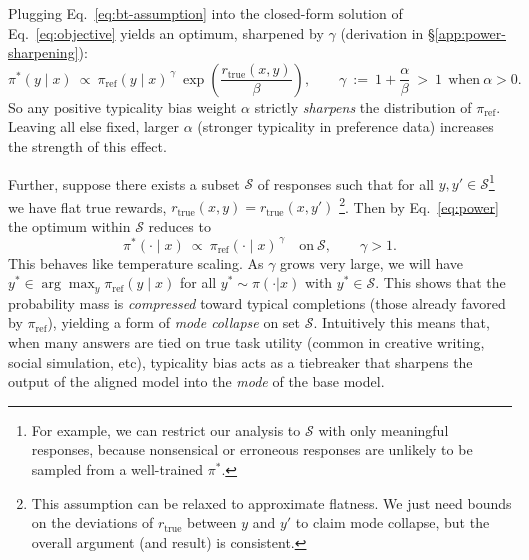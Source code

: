 Plugging Eq.~\ref{eq:bt-assumption} 
into the closed-form solution of Eq.~\ref{eq:objective} \citep{rafailov2024directpreferenceoptimizationlanguage}  yields an optimum, sharpened by $\gamma$ (derivation in \S\ref{app:power-sharpening}):
\begin{equation}
\pi^*(y\mid x)\ \propto\ \pi_{\mathrm{ref}}(y\mid x)^{\,\gamma}\ \exp\!\left(\frac{r_{\text{true}}(x,y)}{\beta}\right),\qquad
\gamma\ :=\ 1+\frac{\alpha}{\beta}\ >\ 1\ \ \text{when}\ \alpha>0.
\label{eq:power}
\end{equation}
So any positive typicality bias weight $\alpha$ strictly \emph{sharpens} the distribution of $\pi_{\text{ref}}$. Leaving all else fixed, larger $\alpha$ (stronger typicality in preference data) increases the strength of this effect.

Further, suppose there exists a subset $\mathcal{S}$ of responses such that for all $y,y'\!\in\!\mathcal{S}$\footnote{For example, we can restrict our analysis to $\mathcal{S}$ with only meaningful responses, because nonsensical or erroneous responses are unlikely to be sampled from a well-trained $\pi^*$. 
} we have 
flat true rewards, $r_{\text{true}}(x,y)=r_{\text{true}}(x,y')$
\footnote{This assumption can be relaxed to approximate flatness. We just need bounds on the deviations of $r_{\mathrm{\text{true}}}$ between $y$ and $y'$ to claim mode collapse, but the overall argument (and result) is consistent. 
}.%
Then by Eq.~\ref{eq:power} the optimum within $\mathcal{S}$ reduces to
\[
\pi^*(\cdot\mid x)\ \propto\ \pi_{\mathrm{ref}}(\cdot\mid x)^{\,\gamma}\quad\text{on}\ \mathcal{S},
\qquad \gamma>1.
\]
This behaves like temperature scaling. As $\gamma$ grows very large, we will have $y^* \in \arg\max_y \pi_\text{ref}(y \mid x)$ for all $y^* \sim \pi(\cdot | x)$ with $y^* \in \mathcal{S}$.
This shows that the probability mass is \emph{compressed} toward typical completions (those already favored by $\pi_{\mathrm{ref}}$), yielding a form of \emph{mode collapse} on set $\mathcal{S}$. %
Intuitively this means that, when many answers are tied on true task utility (common in creative writing, social simulation, etc), typicality bias acts as a tiebreaker that sharpens the output of the aligned model into the \textit{mode} of the base model. %

